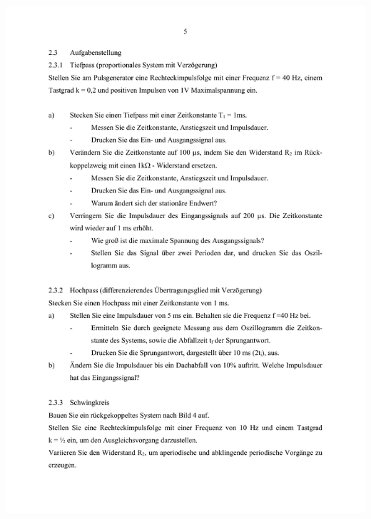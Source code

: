 \includegraphics[width=1.0\textwidth]{Bilder/Grundubertragungsglieder im Zeitbereich (verschoben) 5}\newpage
